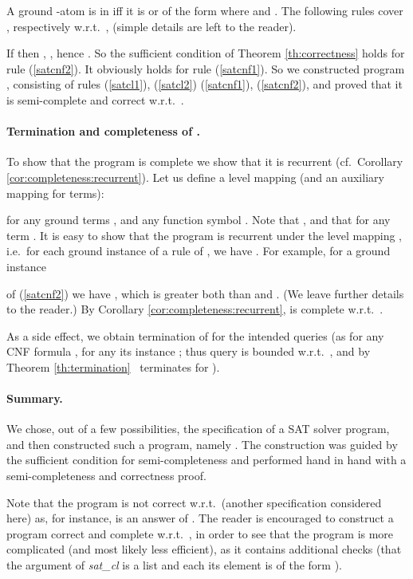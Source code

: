 \documentclass{tlp}
\begin{document}
A ground -atom is in  iff it is  or of the form
 where  and .
The following rules cover  , respectively  w.r.t.\ , 
(simple details are left to the reader).

If  then , ,
hence .
So the sufficient condition of Theorem \ref{th:correctness}
holds for rule (\ref{satcnf2}).  It obviously holds for rule (\ref{satcnf1}).
So we constructed program , consisting of rules
(\ref{satcl1}), (\ref{satcl2})
(\ref{satcnf1}), (\ref{satcnf2}), and proved that it is semi-complete and
correct w.r.t.\ .


\paragraph{Termination and completeness of .}


To show that the program is complete we show that it is recurrent
(cf.\ Corollary \ref{cor:completeness:recurrent}).
Let us define a level mapping  \mbox{}
(and an auxiliary mapping   for terms):

for any ground terms , and any function symbol . 
Note that , and that
 for any term .
It is easy to show that the program  is recurrent under the level
mapping , i.e.\ 
for each ground instance  of a rule of  ,
we have .  For example, for a ground instance 

of (\ref{satcnf2}) we have
, which is greater both than
 and .
(We leave further details to the reader.)
By Corollary \ref{cor:completeness:recurrent},  is complete w.r.t.\ .


As a side effect, we obtain termination of  for the intended queries
(as for any CNF formula ,  for any its instance ;
thus query  is bounded  w.r.t.\ , 
and by Theorem \ref{th:termination} ~terminates for ).


\paragraph{Summary.}
We chose, out of a few possibilities, the specification  of a SAT solver
program, and then constructed such a program, namely .
The construction was guided by the sufficient condition for semi-completeness
and performed hand in hand with a semi-completeness and correctness proof.

Note that the program is not correct w.r.t.\  (another 
specification considered here)
as, for instance,  is an answer
of . 
The reader is encouraged to construct a program correct and complete w.r.t.\ 
,
in order to see that the program is more complicated (and most likely less
efficient), as it contains additional checks 
(that the argument of {\it sat\_cl} is a list and each its element is of the
form ).
\end{document}
